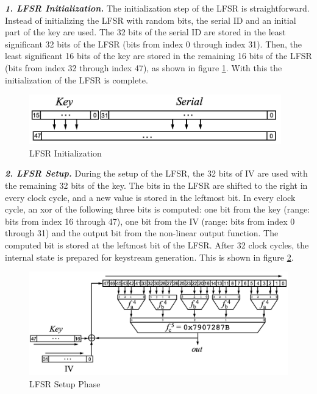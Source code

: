 \noindent \textit{\textbf{1. LFSR Initialization.}} The initialization step of the LFSR is straightforward. Instead of initializing the LFSR with random bits, the serial ID and an initial part of the key are used. The 32 bits of the serial ID are stored in the least significant 32 bits of the LFSR (bits from index 0 through index 31). Then, the least significant 16 bits of the key are stored in the remaining 16 bits of the LFSR (bits from index 32 through index 47), as shown in figure \ref{fig:hitag2-1}. With this the initialization of the LFSR is complete.\\

\begin{figure}[ht!]
	\centering
		\includegraphics[width=4.3in]{./figures/hitag2-1.PNG}
	\caption{LFSR Initialization \cite{hitag2-figure}}	
	\label{fig:hitag2-1}
\end{figure}

\noindent \textit{\textbf{2. LFSR Setup.}} During the setup of the LFSR, the 32 bits of IV are used with the remaining 32 bits of the key. The bits in the LFSR are shifted to the right in every clock cycle, and a new value is stored in the leftmost bit. In every clock cycle, an xor of the following three bits is computed: one bit from the key (range: bits from index 16 through 47), one bit from the IV (range: bits from index 0 through 31) and the output bit from the non-linear output function. The computed bit is stored at the leftmost bit of the LFSR. After 32 clock cycles, the internal state is prepared for keystream generation. This is shown in figure \ref{fig:hitag2-2}.\\

\begin{figure}[ht!]
	\centering
		\includegraphics[width=5.5in]{./figures/hitag2-2.PNG}
	\caption{LFSR Setup Phase \cite{hitag2-figure}}	
	\label{fig:hitag2-2}
\end{figure}

